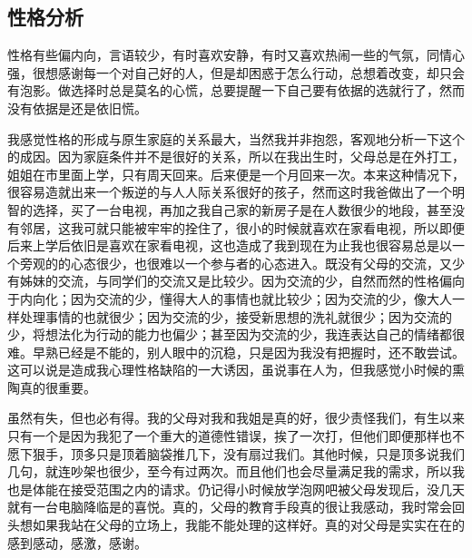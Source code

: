 \documentclass{article}
\begin{document}
\subsection{性格分析}
性格有些偏内向，言语较少，有时喜欢安静，有时又喜欢热闹一些的气氛，同情心强，很想感谢每一个对自己好的人，但是却困惑于怎么行动，总想着改变，却只会有泡影。做选择时总是莫名的心慌，总要提醒一下自己要有依据的选就行了，然而没有依据是还是依旧慌。\par
我感觉性格的形成与原生家庭的关系最大，当然我并非抱怨，客观地分析一下这个的成因。因为家庭条件并不是很好的关系，所以在我出生时，父母总是在外打工，姐姐在市里面上学，只有周天回来。后来便是一个月回来一次。本来这种情况下，很容易造就出来一个叛逆的与人人际关系很好的孩子，然而这时我爸做出了一个明智的选择，买了一台电视，再加之我自己家的新房子是在人数很少的地段，甚至没有邻居，这我可就只能被牢牢的拴住了，很小的时候就喜欢在家看电视，所以即便后来上学后依旧是喜欢在家看电视，这也造成了我到现在为止我也很容易总是以一个旁观的的心态很少，也很难以一个参与者的心态进入。既没有父母的交流，又少有姊妹的交流，与同学们的交流又是比较少。因为交流的少，自然而然的性格偏向于内向化；因为交流的少，懂得大人的事情也就比较少；因为交流的少，像大人一样处理事情的也就很少；因为交流的少，接受新思想的洗礼就很少；因为交流的少，将想法化为行动的能力也偏少；甚至因为交流的少，我连表达自己的情绪都很难。早熟已经是不能的，别人眼中的沉稳，只是因为我没有把握时，还不敢尝试。这可以说是造成我心理性格缺陷的一大诱因，虽说事在人为，但我感觉小时候的熏陶真的很重要。\par 
虽然有失，但也必有得。我的父母对我和我姐是真的好，很少责怪我们，有生以来只有一个是因为我犯了一个重大的道德性错误，挨了一次打，但他们即便那样也不愿下狠手，顶多只是顶着脑袋推几下，没有扇过我们。其他时候，只是顶多说我们几句，就连吵架也很少，至今有过两次。而且他们也会尽量满足我的需求，所以我也是体能在接受范围之内的请求。仍记得小时候放学泡网吧被父母发现后，没几天就有一台电脑降临是的喜悦。真的，父母的教育手段真的很让我感动，我时常会回头想如果我站在父母的立场上，我能不能处理的这样好。真的对父母是实实在在的感到感动，感激，感谢。\par 
\end{document}
